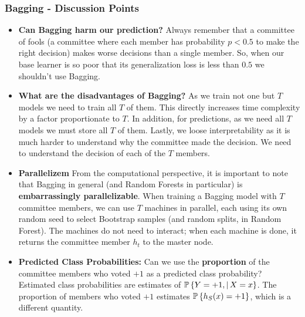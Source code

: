 \subsubsection{Bagging - Discussion Points}
\begin{itemize}
	\item \textbf{Can Bagging harm our prediction?} Always remember that a committee of fools (a committee where each member has probability $p<0.5$ to make the right decision) makes worse decisions than a single member. So, when our base learner is so poor that its generalization loss is less than $0.5$ we shouldn't use Bagging.
	\item \textbf{What are the disadvantages of Bagging?} As we train not one but $T$ models we need to train all $T$ of them. This directly increases time complexity by a factor proportionate to $T$. In addition, for predictions, as we need all $T$ models we must store all $T$ of them. Lastly, we loose interpretability as it is much harder to understand why the committee made the decision. We need to understand the decision of each of the $T$ members.
	\item \textbf{Parallelizem} From the computational perspective, it is important to note that Bagging in general (and Random Forests in particular) is \textbf{embarrassingly parallelizable}. When training a Bagging model with $T$ committee members, we can use $T$ machines in parallel, each using its own random seed to select Bootstrap samples (and random splits, in Random Forest). The machines do not need to interact; when each machine is done, it returns the committee member $h_t$ to the master node.
	\item \textbf{Predicted Class Probabilities:} Can we use the \textbf{proportion} of the committee members who voted $+1$ as a predicted class probability? Estimated class probabilities are estimates of $\mathbb{P}\left\{ Y=+1,|\, X=x \right\}$. The proportion of members who voted $+1$ estimates $\mathbb{P}\left\{ h_S(x)=+1 \right\}$, which is a different quantity.
\end{itemize}

